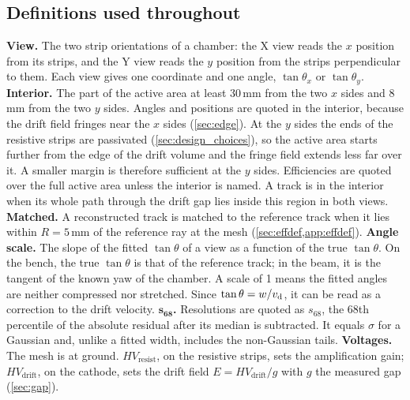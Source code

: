 \subsection{Definitions used throughout}\label{sec:definitions}
\textbf{View.} The two strip orientations of a chamber: the X view reads the $x$ position from its strips, and the Y view reads the $y$
position from the strips perpendicular to them. Each view gives one coordinate and one angle, $\tan\theta_x$ or $\tan\theta_y$.
\textbf{Interior.} The part of the active area at least 30\,mm from the two $x$ sides and 8\,mm from the two $y$
sides. Angles and positions are quoted in the interior, because the drift field fringes near the $x$ sides
(\cref{sec:edge}). At the $y$ sides the ends of the resistive strips are passivated (\cref{sec:design_choices}), so the active area starts further from the edge of the drift volume and the fringe field extends less far over it. A smaller margin is therefore sufficient at the $y$ sides. Efficiencies are quoted over the full active area unless the interior is named.
A track is in the interior when its whole path through the drift gap lies inside this region in both views.
\textbf{Matched.} A reconstructed track is matched to the reference track when it lies within $R=5$\,mm of the reference ray
at the mesh (\cref{sec:effdef,app:effdef}).
\textbf{Angle scale.} The slope of the fitted $\tan\theta$ of a view as a function of the true $\tan\theta$. On the bench, the true
$\tan\theta$ is that of the reference track; in the beam, it is the tangent of the known yaw of the chamber. A scale of 1 means the
fitted angles are neither compressed nor stretched. Since $\tan\theta=w/v_\mathrm{d}$, it can be read as a correction to the drift velocity.
\textbf{$\boldsymbol{s_{68}}$.} Resolutions are quoted as $s_{68}$, the 68th percentile of the absolute residual after its median is subtracted. It equals $\sigma$ for a Gaussian and, unlike a fitted width, includes the non-Gaussian tails.
\textbf{Voltages.} The mesh is at ground. $HV_\mathrm{resist}$, on the resistive strips, sets the amplification gain;
$HV_\mathrm{drift}$, on the cathode, sets the drift field $E=HV_\mathrm{drift}/g$ with $g$ the measured gap
(\cref{sec:gap}).

